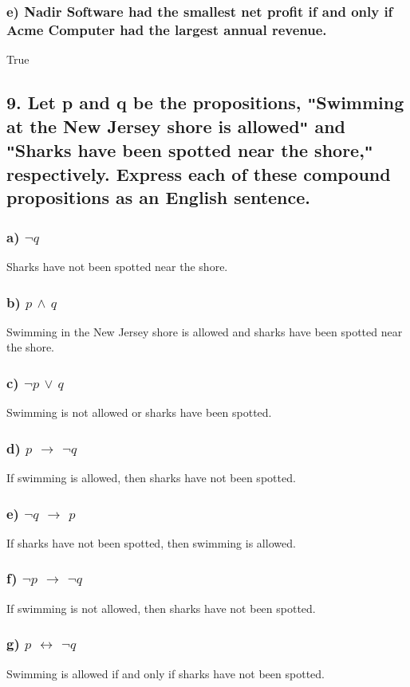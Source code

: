 \documentclass[11pt, oneside]{article} %
\numberwithin{equation}{section} %
\numberwithin{figure}{section} %
\numberwithin{table}{section} %
\begin{document}
\subsubsection{e) Nadir Software had the smallest net profit if and only if Acme Computer had the largest annual revenue.}
True

\subsection{9. Let p and q be the propositions, \texttt{"}Swimming at the New Jersey shore is allowed\texttt{"} and \texttt{"}Sharks have been spotted near the shore,\texttt{"} respectively. Express each of these compound propositions as an English sentence.}
\subsubsection{a) $\neg$$q$}
Sharks have not been spotted near the shore.
\subsubsection{b) $p$ $\wedge$ $q$}
Swimming in the New Jersey shore is allowed and sharks have been spotted near the shore.
\subsubsection{c) $\neg$$p$ $\vee$ $q$}
Swimming is not allowed or sharks have been spotted.
\subsubsection{d) $p$ $\rightarrow$ $\neg$$q$}
If swimming is allowed, then sharks have not been spotted.
\subsubsection{e) $\neg$$q$ $\rightarrow$ $p$}
If sharks have not been spotted, then swimming is allowed.
\subsubsection{f) $\neg$$p$ $\rightarrow$ $\neg$$q$}
If swimming is not allowed, then sharks have not been spotted.
\subsubsection{g) $p$ $\leftrightarrow$ $\neg$$q$}
Swimming is allowed if and only if sharks have not been spotted.
\end{document}
